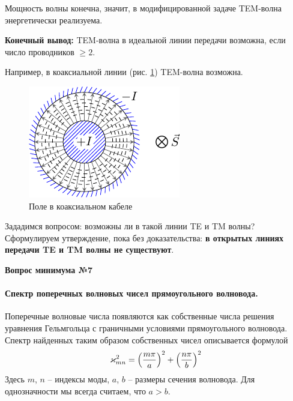 \documentclass[a4paper,14pt]{extarticle}
\newcommand{\ticket}[1] {
\newpage
\hypertarget{num#1}{}
\begin{center}
	\textbf{Вопрос минимума №#1 }
\end{center}
}
\begin{document}
Мощность волны конечна, значит, в модифицированной задаче TEM-волна энергетически реализуема.

\textbf{Конечный вывод:} TEM-волна в идеальной линии передачи возможна, если число проводников $\geq 2$.

Например, в коаксиальной линии (рис. \ref{fig:lect4:6}) TEM-волна возможна.

\begin{figure}[h!]
	\centering
	\includegraphics[scale=1.5]{img/lect4_ris6}
	\caption{Поле в коаксиальном кабеле}
	\label{fig:lect4:6}
\end{figure}

Зададимся вопросом: возможны ли в такой линии TE и TM волны? Сформулируем утверждение, пока без доказательства: \textbf{в открытых линиях передачи TE и TM волны не существуют}.

	





\ticket{7}
\paragraph{Спектр поперечных волновых чисел прямоугольного волновода. } Поперечные волновые числа появляются как собственные числа решения уравнения Гельмгольца с граничными условиями прямоугольного волновода. Спектр найденных таким образом собственных чисел описывается формулой
\begin{equation}
	\varkappa^2_{mn} = \qty(\frac{m\pi}{a})^2+
		\qty(\frac{n\pi}{b})^2
\end{equation}
Здесь $m$, $n$ -- индексы моды, $a$, $b$ -- размеры сечения волновода. Для однозначности мы всегда считаем, что $a>b$.
\end{document}
